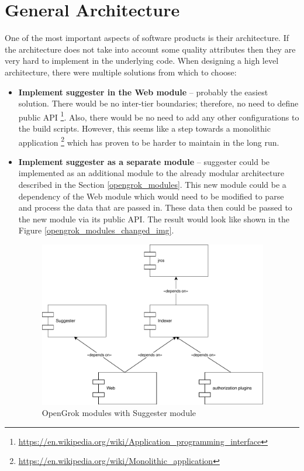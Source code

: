 \section{General Architecture}
\label{general_architecture}
One of the most important aspects of software products is their architecture. If the architecture does not take into account some
quality attributes then they are very hard to implement in the underlying code. When designing a high level architecture,
there were multiple solutions from which to choose:
\begin{itemize}
    \item \textbf{Implement suggester in the Web module} – probably the easiest solution. There would be no inter-tier
    boundaries; therefore, no need to define public API
    \footnote{\url{https://en.wikipedia.org/wiki/Application\_programming\_interface}}. Also, there would be no need
    to add any other configurations to the build scripts. However, this seems like a step towards a monolithic application
    \footnote{\url{https://en.wikipedia.org/wiki/Monolithic\_application}} which has proven to be harder to maintain in the
    long run.
    \item \textbf{Implement suggester as a separate module} – suggester could be implemented as an additional module to
    the already modular architecture described in the Section \ref{opengrok_modules}. This new module could be a dependency of the Web
    module which would need to be modified to parse and process the data that are passed in. These data then could be
    passed to the new module via its public API. The result would look like shown in the Figure \ref{opengrok_modules_changed_img}.
    \begin{figure}[htbp]
    \centering
    \includegraphics[width=100mm]{../img/opengrok_modules_changed.pdf}
    \caption{OpenGrok modules with Suggester module}

\end{figure}
\end{itemize}
